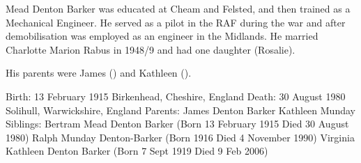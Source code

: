 
Mead Denton Barker was educated at Cheam and Felsted, and then trained as a Mechanical Engineer. He served as a pilot in the RAF during the war and after demobilisation was employed as an engineer in the Midlands. He married Charlotte Marion Rabus in 1948/9 and had one daughter (Rosalie). 

His parents were James () and Kathleen ().

Birth: 	13 February 1915 Birkenhead, Cheshire, England
Death: 	30 August 1980 Solihull, Warwickshire, England
Parents: 	James Denton Barker
Kathleen Munday
Siblings: 	Bertram Mead Denton Barker (Born 13 February 1915
Died 30 August 1980)
Ralph Munday Denton-Barker (Born 1916
Died 4 November 1990)
Virginia Kathleen Denton Barker (Born 7 Sept 1919
Died 9 Feb 2006)

